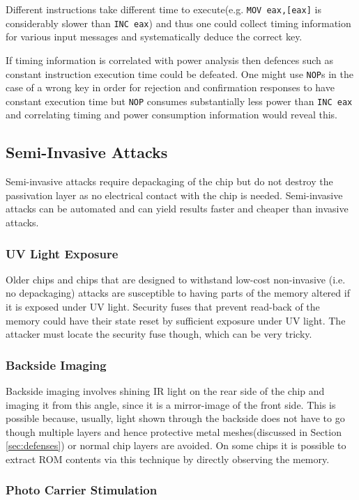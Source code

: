 	Different instructions take different time to execute(e.g. \texttt{MOV eax,[eax]} is considerably slower than \texttt{INC eax}) and thus one could collect timing information for various input messages and systematically deduce the correct key. 
	
	If timing information is correlated with power analysis then defences such as constant instruction execution time could be defeated. One might use \texttt{NOP}s in the case of a wrong key in order for rejection and confirmation responses to have constant execution time but \texttt{NOP} consumes substantially less power than \texttt{INC eax} and correlating timing and power consumption information would reveal this.

	\subsection{Semi-Invasive Attacks}
	Semi-invasive attacks require depackaging of the chip but do not destroy the passivation layer as no electrical contact with the chip is needed. Semi-invasive attacks can be automated and can yield results faster and cheaper than invasive attacks.
	
	\subsubsection{UV Light Exposure}
	Older chips and chips that are designed to withstand low-cost non-invasive (i.e. no depackaging) attacks are susceptible to having parts of the memory altered if it is exposed under UV light. Security fuses that prevent read-back of the memory could have their state reset by sufficient exposure under UV light. The attacker must locate the security fuse though, which can be very tricky. 

	\subsubsection{Backside Imaging}
	Backside imaging involves shining IR light on the rear side of the chip and imaging it from this angle, since it is a mirror-image of the front side. This is possible because, usually, light shown through the backside does not have to go though multiple layers and hence protective metal meshes(discussed in Section \ref{sec:defenses}) or normal chip layers are avoided. On some chips it is possible to extract ROM contents via this technique by directly observing the memory.
	
	\subsubsection{Photo Carrier Stimulation}


